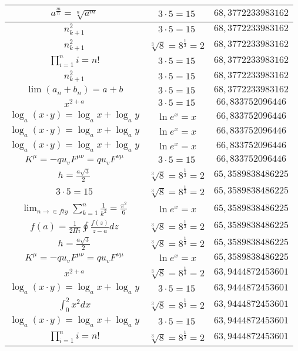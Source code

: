 \documentclass{article}
\begin{document}
\begin{flushleft}
\begin{longtable}{|c|c|c|}
$a^{\frac{m}{n}}=\sqrt[n]{a^{m}}$ & $3\cdot 5=15$ & $68,3772233983162$ \\ \hline 
$n_{k+1}^2$ & $3\cdot 5=15$ & $68,3772233983162$ \\ \hline 
$n_{k+1}^2$ & $\sqrt[3]{8}=8^{\frac{1}{3}}=2$ & $68,3772233983162$ \\ \hline 
$\prod_{i=1}^ni=n!$ & $3\cdot 5=15$ & $68,3772233983162$ \\ \hline 
$n_{k+1}^2$ & $3\cdot 5=15$ & $68,3772233983162$ \\ \hline 
$\lim\left(a_n+b_n\right)=a+b$ & $3\cdot 5=15$ & $68,3772233983162$ \\ \hline 
$x^{2+a}$ & $3\cdot 5=15$ & $66,833752096446$ \\ \hline 
$\log_{a}(x\cdot y)=\log_{a}x+\log_{a}y$ & $\ln e^x=x$ & $66,833752096446$ \\ \hline 
$\log_{a}(x\cdot y)=\log_{a}x+\log_{a}y$ & $\ln e^x=x$ & $66,833752096446$ \\ \hline 
$\log_{a}(x\cdot y)=\log_{a}x+\log_{a}y$ & $\ln e^x=x$ & $66,833752096446$ \\ \hline 
$K^\mu=-qu_vF^{\mu\nu}=qu_vF^{\nu\mu}$ & $3\cdot 5=15$ & $66,833752096446$ \\ \hline 
$h=\frac{a\sqrt{3}}{2}$ & $\sqrt[3]{8}=8^{\frac{1}{3}}=2$ & $65,3589838486225$ \\ \hline 
$3\cdot 5=15$ & $\sqrt[3]{8}=8^{\frac{1}{3}}=2$ & $65,3589838486225$ \\ \hline 
$\lim_{n\to\in fty}\sum_{k=1}^n\frac{1}{k^2}=\frac{\pi^2}{6}$ & $\ln e^x=x$ & $65,3589838486225$ \\ \hline 
$f\left(a\right)=\frac{1}{2\Pi i}\oint\frac{f\left(z\right)}{z-a}dz$ & $\sqrt[3]{8}=8^{\frac{1}{3}}=2$ & $65,3589838486225$ \\ \hline 
$h=\frac{a\sqrt{3}}{2}$ & $\sqrt[3]{8}=8^{\frac{1}{3}}=2$ & $65,3589838486225$ \\ \hline 
$K^\mu=-qu_vF^{\mu\nu}=qu_vF^{\nu\mu}$ & $\ln e^x=x$ & $65,3589838486225$ \\ \hline 
$x^{2+a}$ & $\sqrt[3]{8}=8^{\frac{1}{3}}=2$ & $63,9444872453601$ \\ \hline 
$\log_{a}(x\cdot y)=\log_{a}x+\log_{a}y$ & $3\cdot 5=15$ & $63,9444872453601$ \\ \hline 
$\int _0^2x^2dx$ & $\sqrt[3]{8}=8^{\frac{1}{3}}=2$ & $63,9444872453601$ \\ \hline 
$\log_{a}(x\cdot y)=\log_{a}x+\log_{a}y$ & $3\cdot 5=15$ & $63,9444872453601$ \\ \hline 
$\prod_{i=1}^ni=n!$ & $\sqrt[3]{8}=8^{\frac{1}{3}}=2$ & $63,9444872453601$ \\ \hline 

\end{longtable}
\end{flushleft}
\end{document}
